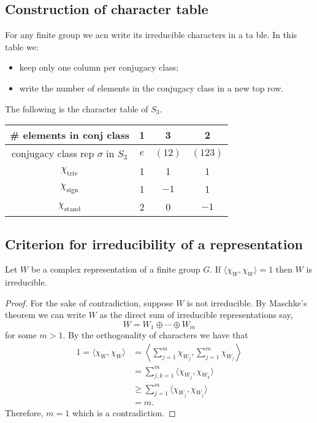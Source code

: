 \documentclass[12pt, a4paper]{article}
\begin{document}
\subsection{Construction of character table}

For any finite group we acn write its irreducible characters in a ta ble. In this table we:
\begin{itemize}
    \item keep only one column per conjugacy class;
    \item write the number of elements in the conjugacy class in a new top row.
\end{itemize}

\begin{mdexample}
    The following is the character table of \(S_3\).
    \begin{center}
        \begin{tabular}{c|c|c|c}
            \# elements in conj class & 1 & 3 & 2 \\ \hline
            conjugacy class rep $\sigma$ in $S_3$ & $e$ & $(12)$ & $(123)$ \\
            \hline
            $\chi_{\text{triv}}$ & 1 & 1 & 1 \\
            $\chi_{\text{sign}}$ & 1 & \(-1\) & 1 \\
            $\chi_{\text{stand}}$ & 2 & 0 & \(-1\) \\
            \hline
        \end{tabular}
    \end{center}
\end{mdexample}

\subsection{Criterion for irreducibility of a representation}

\begin{mdprop}
    Let \(W\) be a complex representation of a finite group \(G\). If \(\langle \chi_W, \chi_W \rangle =1\) then \(W\) is irreducible.
\end{mdprop}

\begin{proof}
    For the sake of contradiction, suppose \(W\) is not irreducible. By Maschke's theorem we can write \(W\) as the direct sum of irreducible representations say,
    \[W = W_1 \oplus \cdots \oplus W_m\]
    for some \(m>1\). By the orthogonality of characters we have that 
    \[\begin{aligned}
        1 = \langle \chi_W,\chi_W \rangle &= \left\langle \sum_{j=1}^m \chi_{W_j}, \sum_{j=1}^{m} \chi_{W_j} \right\rangle \\
        &= \sum_{j,k=1}^m \langle \chi_{W_j},\chi_{W_k}\rangle \\
        &\geq \sum_{j=1}^m \langle \chi_{W_j},\chi_{W_j}\rangle \\
        &= m.
    \end{aligned}\]
    Therefore, \(m=1\) which is a contradiction.
\end{proof}
\end{document}
